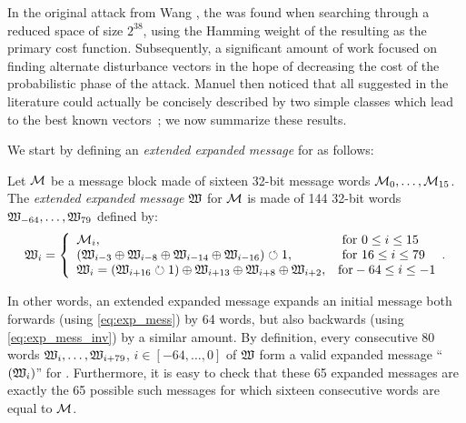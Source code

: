 In the original attack from Wang \etal, the \dv was found when searching through a reduced space of size $2^{38}$, using the Hamming weight of the resulting \dvs
as the primary cost function.
Subsequently, a significant amount of work focused on finding alternate disturbance vectors in the hope of decreasing the cost of the
probabilistic phase of the attack. Manuel then noticed that all \dvs suggested in the literature could actually be concisely described by two simple classes which
lead to the best known vectors~\cite{DBLP:journals/dcc/Manuel11}; we now summarize these results.

\medskip

We start by defining an \emph{extended expanded message} for \shaone as follows:
\begin{defi}
\label{def:eem}
Let  $\mathcal{M}$  be a \shaone message block made of sixteen 32-bit message words $\mathcal{M}_0, \ldots, \mathcal{M}_{15}$. The \emph{extended expanded message} $\mathfrak{W}$ for $\mathcal{M}$
is made of 144 32-bit words $\mathfrak{W}_{-64}, \ldots, \mathfrak{W}_{79}$ defined by:
\begin{equation}
\label{eq:ext_exp_mess}
\mathfrak{W}_i=
\left\{
\begin{array}{ll}
\mathcal{M}_i, & \textnormal{ for } 0\leq i\leq 15 \\
(\mathfrak{W}_{i-3} \oplus \mathfrak{W}_{i-8} \oplus \mathfrak{W}_{i-14} \oplus \mathfrak{W}_{i-16}) \circlearrowleft 1, & \textnormal{ for } 16\leq i\leq 79\\
\mathfrak{W}_{i} = (\mathfrak{W}_{i+16} \circlearrowright 1) \oplus \mathfrak{W}_{i+13} \oplus \mathfrak{W}_{i+8} \oplus \mathfrak{W}_{i+2}, & \textnormal{for} -64\leq i\leq -1
\end{array}.
\right.
\end{equation}
\end{defi}
In other words, an extended expanded message expands an initial message both forwards (using \autoref{eq:exp_mess}) by 64 words, but also
backwards (using \autoref{eq:exp_mess_inv}) by a similar amount. By definition, every consecutive 80 words $\mathfrak{W}_i, \ldots, \mathfrak{W}_{i+79}$, $i \in [-64, \ldots, 0]$
of $\mathfrak{W}$ form a valid expanded message ``$(\mathfrak{W}_i)$'' for \shaone. Furthermore, it is easy to check that these 65 expanded messages are exactly the 65 possible such messages
for which sixteen consecutive words are equal to $\mathcal{M}$.

